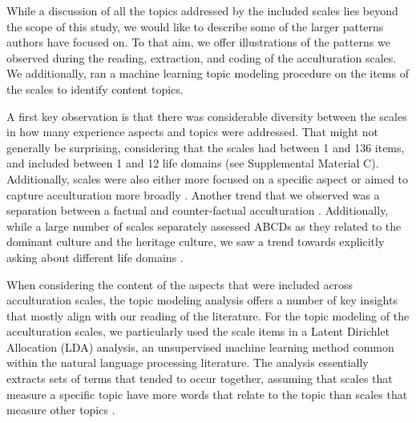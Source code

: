 While a discussion of all the topics addressed by the included scales
lies beyond the scope of this study, we would like to describe some of
the larger patterns authors have focused on. To that aim, we offer
illustrations of the patterns we observed during the reading,
extraction, and coding of the acculturation scales. We additionally, ran
a machine learning topic modeling procedure on the items of the scales
to identify content topics.

A first key observation is that there was considerable diversity between
the scales in how many experience aspects and topics were addressed.
That might not generally be surprising, considering that the scales had
between 1 and 136 items, and included between 1 and 12 life domains (see
Supplemental Material C). Additionally, scales were also either more
focused on a specific aspect
\citep[e.g., `Asian Value Scale';][]{Kim1999, Kim2004a} or aimed to
capture acculturation more broadly
\citep[e.g., `Asian American Multidimensional Acculturation Scale'][]{GimChung2004}.
Another trend that we observed was a separation between a factual and
counter-factual acculturation
\citep[e.g., real vs. ideal,][]{Navas2005, Navas2007, BenetMartinez2006}.
Additionally, while a large number of scales separately assessed ABCDs
as they related to the dominant culture and the heritage culture, we saw
a trend towards explicitly asking about different life domains
\citep[e.g., family, work, media;][also see Supplemental Material C]{Kim2010a, Arends-Toth2007, Mancini2014}.

When considering the content of the aspects that were included across
acculturation scales, the topic modeling analysis offers a number of key
insights that mostly align with our reading of the literature. For the
topic modeling of the acculturation scales, we particularly used the
scale items in a Latent Dirichlet Allocation (LDA) analysis, an
unsupervised machine learning method common within the natural language
processing literature. The analysis essentially extracts sets of terms
that tended to occur together, assuming that scales that measure a
specific topic have more words that relate to the topic than scales that
measure other topics
\citep[we followed the procedures outlined by][for a full methodological detail see Supplemental Material B]{Schweinberger2022}.

